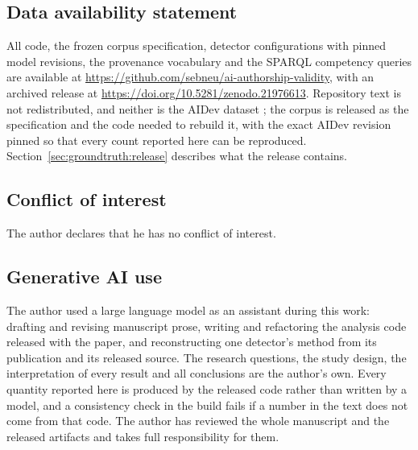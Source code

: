 \documentclass[smallextended,natbib]{svjour3}
\begin{document}
\subsection*{Data availability statement}
\begin{sloppypar}
All code, the frozen corpus specification, detector configurations with pinned model
revisions, the provenance vocabulary and the SPARQL competency queries are available at
\url{https://github.com/sebneu/ai-authorship-validity}, with an archived release at
\url{https://doi.org/10.5281/zenodo.21976613}. Repository text is not redistributed, and
neither is the AIDev dataset \citep{li2025aidev}; the corpus is released as the
specification and the code needed to rebuild it, with the exact AIDev revision pinned so
that every count reported here can be reproduced.
Section~\ref{sec:groundtruth:release} describes what the release contains.
\end{sloppypar}

\subsection*{Conflict of interest}
The author declares that he has no conflict of interest.

\subsection*{Generative AI use}
The author used a large language model as an assistant during this work: drafting and
revising manuscript prose, writing and refactoring the analysis code released with the
paper, and reconstructing one detector's method from its publication and its released
source. The research questions, the study design, the interpretation of every result and
all conclusions are the author's own. Every quantity reported here is produced by the
released code rather than written by a model, and a consistency check in the build fails
if a number in the text does not come from that code. The author has reviewed the whole
manuscript and the released artifacts and takes full responsibility for them.



\end{document}
